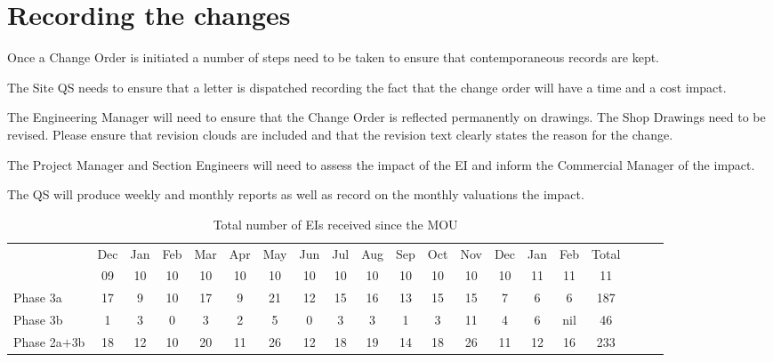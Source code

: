 \section*{Recording the changes}

Once a Change Order is initiated a number of steps need to be taken
to ensure that contemporaneous records are kept.

The Site QS needs to ensure that a letter is dispatched recording the fact
that the change order will have a time and a cost impact.

The Engineering Manager will need to ensure that the Change Order is reflected
permanently on drawings. The Shop Drawings need to be revised. Please ensure
that revision clouds are included and that the revision text clearly states
the reason for the change.

The Project Manager and Section Engineers will need to assess the impact of
the EI and inform the Commercial Manager of the impact.

The QS will produce weekly and monthly reports as well as record on the
monthly valuations the impact.

\begin{fullwidth}
\begin{table}[htbp]
\vspace{1cm}
\small
\begin{tabular}{l c c c c c c c c c c c c c c c c c c c}
\toprule
~ &Dec & Jan & Feb & Mar & Apr& May & Jun & Jul & Aug & Sep &Oct & Nov &Dec &Jan & Feb  & Total\\
~ &09  & 10  & 10  & 10  & 10 & 10  & 10  & 10  & 10  & 10  &10  & 10   &10 &11&11&11 \\
\midrule
Phase 3a &17 &9 &10 &17 &9 &21 &12 &15 &16 &13 &15 &15 &7 &6&6&187\\
Phase 3b &1   &3 &0 &3 &2 &5 &0 &3 &3 &1 &3 &11 &4 &6&nil&46\\
\midrule
Phase 2a$+$3b &18 &12 &10 &20 &11 &26 &12 &18 &19 &14 &18 &26 &11 &12&16&233\\

\bottomrule
\end{tabular}
\hskip-10cm\caption{Total number of EIs received since the MOU}
\label{tbl:EI}
\end{table}
\end{fullwidth}

